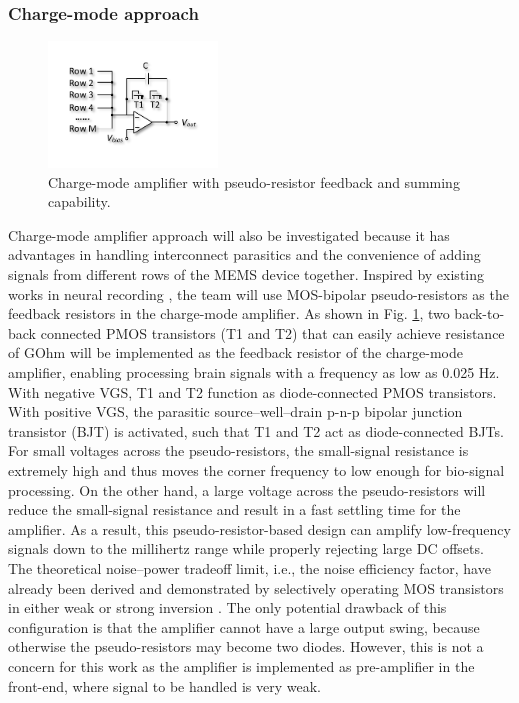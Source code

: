 \subsubsection{Charge-mode approach}

\begin{figure}
\centering
\includegraphics[width=0.4\textwidth]{cmos}
\caption{Charge-mode amplifier with pseudo-resistor feedback and summing capability.}
\label{fig:cmos}
\end{figure}

Charge-mode amplifier approach will also be investigated because it has advantages in handling interconnect parasitics and the convenience of adding signals from different rows of the MEMS device together. Inspired by existing works in neural recording \cite{harrison2003low}, the team will use MOS-bipolar pseudo-resistors as the feedback resistors in the charge-mode amplifier. As shown in Fig. \ref{fig:cmos}, two back-to-back connected PMOS transistors (T1 and T2) that can easily achieve resistance of GOhm will be implemented as the feedback resistor of the charge-mode amplifier, enabling processing brain signals with a frequency as low as 0.025 Hz. With negative VGS, T1 and T2 function as diode-connected PMOS transistors. With positive VGS, the parasitic source–well–drain p-n-p bipolar junction transistor (BJT) is activated, such that T1 and T2 act as diode-connected BJTs. For small voltages across the pseudo-resistors, the small-signal resistance is extremely high and thus moves the corner frequency to low enough for bio-signal processing. On the other hand, a large voltage across the pseudo-resistors will reduce the small-signal resistance and result in a fast settling time for the amplifier. As a result, this pseudo-resistor-based design can amplify low-frequency signals down to the millihertz range while properly rejecting large DC offsets. The theoretical noise–power tradeoff limit, i.e., the noise efficiency factor, have already been derived and demonstrated by selectively operating MOS transistors in either weak or strong inversion \cite{harrison2003low}. The only potential drawback of this configuration is that the amplifier cannot have a large output swing, because otherwise the pseudo-resistors may become two diodes. However, this is not a concern for this work as the amplifier is implemented as pre-amplifier in the front-end, where signal to be handled is very weak.

